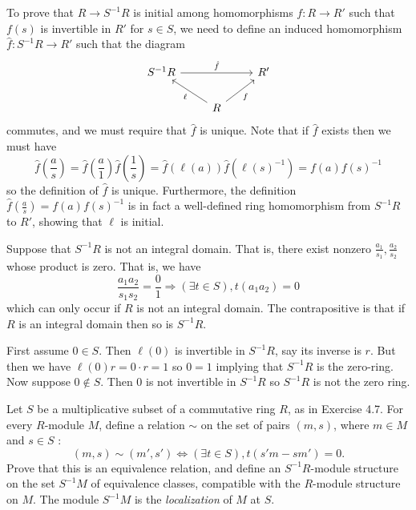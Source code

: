 \documentclass[../../master.tex]{subfiles}
\begin{document}
\begin{solution}
        To prove that $R \to S^{-1}R$ is initial among homomorphisms $f: R \to
        R'$ such that $f(s)$ is invertible in $R'$ for $s \in S$, we need to
        define an induced homomorphism $\hat{f}: S^{-1}R \to R'$ such that the
        diagram
        \[
        \begin{tikzcd}
            {S^{-1}R} && {R'} \\
                      & R
            \arrow["f"', from=2-2, to=1-3]
            \arrow["\ell", from=2-2, to=1-1]
            \arrow["{\hat{f}}", from=1-1, to=1-3]
        \end{tikzcd}
        \]
        commutes, and we must require that $\hat{f}$ is unique. Note that if
        $\hat{f}$ exists then we must have
        \[
            \hat{f}\left(\frac{a}{s}\right) = \hat{f} \left(\frac{a}{1}\right)
            \hat{f} \left(\frac{1}{s}\right) = \hat{f}(\ell(a))
            \hat{f}(\ell(s)^{-1}) = f(a) f(s)^{-1}
        \] 
        so the definition of $\hat{f}$ is unique. Furthermore, the definition
        $\hat{f}\left(\frac{a}{s}\right) = f(a) f(s)^{-1}$ is in fact a
        well-defined ring homomorphism from $S^{-1}R$ to $R'$, showing that
        $\ell$ is initial.

        Suppose that $S^{-1}R$ is not an integral domain. That is, there exist
        nonzero $\frac{a_1}{s_1}, \frac{a_2}{s_2}$ whose product is zero. That
        is, we have
        \[
            \frac{a_1 a_2}{s_1 s_2} = \frac{0}{1} \Longrightarrow (\exists t \in
            S), t(a_1 a_2) = 0
        \] 
        which can only occur if $R$ is not an integral domain. The
        contrapositive is that if $R$ is an integral domain then so is
        $S^{-1}R$.

        First assume $0 \in S$. Then $\ell(0)$ is invertible in $S^{-1}R$, say
        its inverse is $r$. But then we have $\ell(0) r = 0 \cdot r = 1$ so $0 =
        1$ implying that $S^{-1}R$ is the zero-ring. Now suppose $0 \notin S$.
        Then $0$ is not invertible in $S^{-1}R$ so $S^{-1}R$ is not the zero
        ring.
    \end{solution}

    \begin{problem}
        Let $S$ be a multiplicative subset of a commutative ring $R$, as in
        Exercise 4.7. For every $R$-module $M$, define a relation $\sim$ on
        the set of pairs $(m, s)$, where $m \in M$ and $s \in S$ :
        \[
            (m, s) \sim (m', s') \Longleftrightarrow (\exists t \in S),
            t(s'm - sm') = 0.
        \] 
        Prove that this is an equivalence relation, and define an
        $S^{-1}R$-module structure on the set $S^{-1}M$ of equivalence
        classes, compatible with the $R$-module structure on $M$. The module
        $S^{-1}M$ is the \textit{localization} of $M$ at $S$.
    \end{problem}
\end{document}
